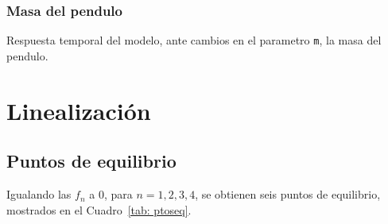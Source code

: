 \documentclass{ieeeaccess}
\begin{document}
\subsubsection{Masa del pendulo}
       {Respuesta temporal del modelo, ante cambios en el parametro
         \texttt{m}, la masa del pendulo.\label{fig:var-mass}}
\section{Linealización}

\subsection{Puntos de equilibrio}
Igualando las $f_n$ a 0, para $n=1,2,3,4$, se obtienen seis puntos de
equilibrio, mostrados en el Cuadro~\ref{tab: ptoseq}.
\end{document}
